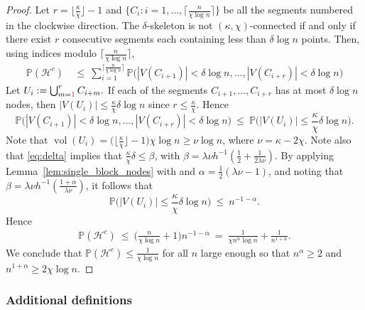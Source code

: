 \documentclass[letterpaper,11pt]{article}
\theoremstyle{definition}
\def\P{\mathbb{P}}
\def\cH{\mathcal{H}}
\def\weq{ \ = \ }
\def\wle{ \ \le \ }
\newcommand{\volume}{\operatorname{vol}}
\numberwithin{equation}{section}
\newcommand{\al}{\alpha}
\newcommand{\be}{\beta}
\newcommand{\de}{\delta}
\newcommand{\ka}{\kappa}
\newcommand{\la}{\lambda}
\newcommand{\LLupdated}[1]{{\color{purple}#1}}
\theoremstyle{definition}
\def\P{\mathbb{P}}
\def\cH{\mathcal{H}}
\def\weq{ \ = \ }
\def\wle{ \ \le \ }
\newcommand{\volume}{\operatorname{vol}}
\numberwithin{equation}{section}
\newcommand{\al}{\alpha}
\newcommand{\be}{\beta}
\newcommand{\de}{\delta}
\newcommand{\ka}{\kappa}
\newcommand{\la}{\lambda}
\newcommand{\LLupdated}[1]{{\color{purple}#1}}
\theoremstyle{thmstyletwo}%
\begin{document}
\begin{proof}
Let $r= \lfloor\frac{\ka}{\chi}\rfloor-1$ and $\{C_i:i=1,\dots,\lceil\frac{n}{\chi \log n}\rceil\}$
be all the segments numbered in the clockwise direction.
The $\de$-skeleton is not $(\ka,\chi)$-connected if and only if there exist $r$ consecutive segments each containing less than $\de \log n$ points.  Then, using indices modulo $\big\lceil\frac{n}{\chi \log n}\big\rceil$,
\begin{align*}
 \P(\cH^c)
 &\wle \sum_{i=1}^{\lceil\frac{n}{\chi \log n}\rceil}
 \P\big( |V(C_{i+1})| < \de \log n, \dots, |V(C_{i+r})| < \de \log n \big) 
\end{align*}
Let 
\(
 U_i := \bigcup_{m=\LLupdated{1}}^r C_{i+m}.
\) 
If each of the segments $C_{i+1},\dots,C_{i+r}$ has at most $\de \log n$ nodes, then $|V(U_i)| \le \frac{\ka}{\chi}\de \log n$ since $r \le \frac{\ka}{\chi}$.
Hence
\begin{equation*}
 \P\big( |V(C_{i+1})| < \de \log n, \dots, |V(C_{i+r})| < \de \log n \big) 
 \wle \P\Big(|V(U_i)| \le \frac{\ka}{\chi} \de \log n \Big).
\end{equation*}
Note that $\volume(U_i) = \big(\lfloor \frac{\ka}{\chi}\rfloor-1\big)\chi \log n \ge \nu \log n$,
where $\nu = \ka - 2\chi$. Note also that \eqref{eq:delta} implies that $\frac{\ka}{\chi}\de \le \be$,
with $\be = \la \nu h^{-1}( \frac12 + \frac{1}{2\la\nu})$.
By applying Lemma~\ref{lem:single_block_nodes} with 
and
$\al = \frac12(\la\nu-1)$, and noting that $\be = \la \nu h^{-1}( \frac{1+\al}{\la\nu})$,
it follows that 
\[
 \P\Big(|V(U_i)| \le \frac{\ka}{\chi} \de \log n \Big)
 \wle n^{-1-\al}.
\]
Hence
\begin{align*}
 \P(\cH^c)
 \wle \bigg(\frac{n}{\chi \log n} + 1 \bigg) n^{-1-\al}
 \weq \frac{1}{\chi n^{\al} \log n} + \frac{1}{n^{1+\al}}.
\end{align*}
We conclude that
$\P(\cH^c) \le \frac{1}{\chi \log n}$ for all $n$ large enough
so that
$n^\al \ge 2$ and $n^{1+\al} \ge 2 \chi \log n$.
\end{proof}

\subsubsection{Additional definitions}
\end{document}
